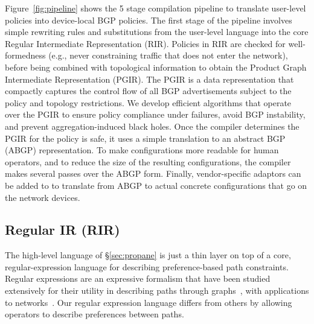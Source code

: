 Figure~\ref{fig:pipeline} shows the 5 stage compilation pipeline to translate user-level \sysname policies into device-local BGP policies. The first stage of the pipeline involves simple rewriting rules and substitutions from the user-level language into the core Regular Intermediate Representation (RIR). Policies in RIR are checked for well-formedness (e.g., never constraining traffic that does not enter the network), before being combined with topological information to obtain the Product Graph Intermediate Representation (PGIR). The PGIR is a data representation that compactly captures the control flow of all BGP advertisements subject to the policy and topology restrictions. We develop efficient algorithms that operate over the PGIR to ensure policy compliance under failures, avoid BGP instability, and prevent aggregation-induced black holes. Once the compiler determines the PGIR for the policy is safe, it uses a simple translation to an abstract BGP (ABGP) representation. To make configurations more readable for human operators, and to reduce the size of the resulting configurations, the \sysname compiler makes several passes over the ABGP form. Finally, vendor-specific adaptors can be added to \sysname to translate from ABGP to actual concrete configurations that go on the network devices.


\subsection{Regular IR (RIR)}
\label{sec:rir}

The high-level language of \S\ref{sec:propane} is just a thin layer on top of a core, regular-expression language for describing preference-based path constraints. Regular expressions are an expressive formalism that have been studied extensively for their utility in describing paths through graphs~\cite{bib:todo}, with applications to networks~\cite{bib:todo}. Our regular expression language differs from others by allowing operators to describe preferences between paths.

\newcommand{\BNFALT}{\;\;|\;\;}
\newcommand{\hdr}[2]{\flushleft \chdr{#1}{#2}}
\newcommand{\chdr}[2]{\textbf{#1} {#2} \\ \centering}

